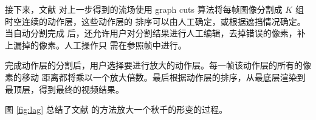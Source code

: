 接下来，文献 \cite{liu2005motion} 对上一步得到的流场使用 graph
cuts 算法将每帧图像分割成 $K$ 组时空连续的动作层，这些动作层的
排序可以由人工确定，或根据遮挡情况确定。当自动分割完成
后，还允许用户对分割结果进行人工编辑，去掉错误的像素，补上漏掉的像素。人工操作只
需在参照帧中进行。

完成动作层的分割后，用户选择要进行放大的动作层。每一帧该动作层的所有的像素的移动
距离都将乘以一个放大倍数。最后根据动作层的排序，从最底层渲染到最顶层，得到最终的视频结果。%






图 \ref{fig:lag} 总结了文献 \cite{liu2005motion} 的方法放大一个秋千的形变的过程。

